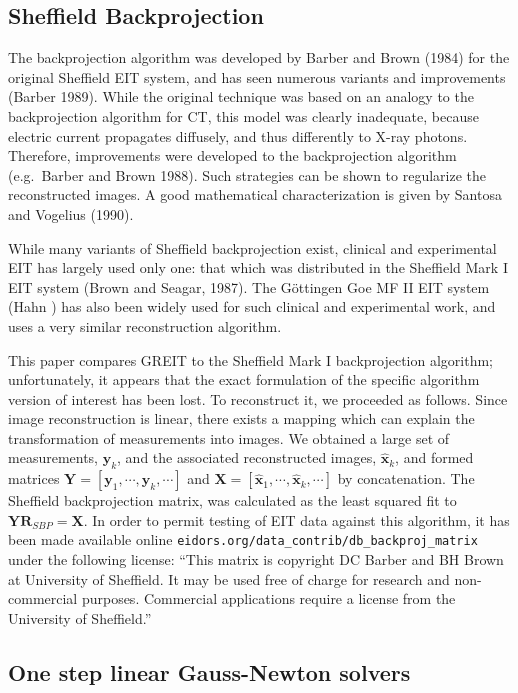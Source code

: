 \documentclass[12pt]{iopart}
\newcommand{\xH}{\mbox{$\mathbf{\hat x}$}}
\newcommand{\yB}{\mbox{$\mathbf{y}$}}
\newcommand{\RB}{\mbox{$\mathbf{R}$}}
\newcommand{\XB}{\mbox{$\mathbf{X}$}}
\newcommand{\YB}{\mbox{$\mathbf{Y}$}}
\begin{document}
\subsection{Sheffield Backprojection}

The backprojection algorithm was developed by 
Barber and Brown (1984) for the original 
Sheffield EIT system, and  has seen numerous 
variants and improvements (Barber 1989). While the original
technique was based on an analogy to the backprojection
algorithm for CT, this model was clearly inadequate, because
electric current propagates diffusely, and thus differently
to X-ray photons. Therefore, improvements
were developed to the backprojection algorithm
(e.g.\ Barber and Brown 1988). Such strategies
can be shown to regularize the reconstructed images.
A good mathematical characterization is given by
Santosa and Vogelius (1990).

While many variants of Sheffield backprojection exist,
clinical and experimental EIT has largely used only
one: that which was distributed in the
Sheffield Mark I EIT system (Brown and Seagar, 1987).
The G\"ottingen Goe MF II EIT system (Hahn )
has also been widely used for such clinical and
experimental work, and uses a very similar reconstruction
algorithm.

This paper compares GREIT to the Sheffield Mark I
backprojection algorithm;
unfortunately, it appears that the exact formulation
of the specific algorithm version of interest has been
lost. To reconstruct it, we proceeded as follows.
Since image reconstruction is linear, there exists
a mapping which can explain the transformation of
measurements into images. We obtained a large set of
measurements, $\yB_k$, and the associated
reconstructed images, $\xH_k$, and formed matrices
$\YB = [ \yB_1, \cdots, \yB_k, \cdots]$ and 
$\XB = [ \xH_1, \cdots, \xH_k, \cdots]$ by concatenation.
The Sheffield backprojection matrix, was
calculated as the least squared fit to
   $\YB \RB_{SBP} = \XB$.
In order to permit testing of EIT data against
this algorithm, it has been made available
online 
\verb$eidors.org/data_contrib/db_backproj_matrix$
under the following license:
``This matrix is copyright DC Barber and BH Brown at
  University of Sheffield. It may be used free of charge
  for research and non-commercial purposes. Commercial
  applications require a license from the University of Sheffield.''


\subsection{One step linear Gauss-Newton solvers}
\label{subsec:OSLGNS}
\end{document}
